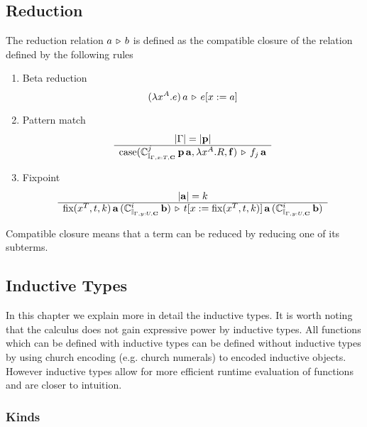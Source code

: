 \subsection{Reduction}
\label{sec:reduction}

\begin{definition}
  The reduction relation $a \,\triangleright\, b$ is defined as the compatible closure of
  the relation defined by the following rules
  \begin{enumerate}

  \item Beta reduction
    $$
    (\lambda x^A.e)\,a \,\triangleright\, e[x:=a]
    $$

  \item Pattern match
    $$
    \begin{array}{c} |\Gamma| = |\mathbf{p}| \\ \hline 
      \text{case}(
      \mathbb{C}^j_{\mathbb{I}_{\Gamma,x:T,\mathbf{C}}}\,\mathbf{p}\,\mathbf{a},
      \lambda x^A.R,
      \mathbf{f})
      \,\triangleright\, f_j \, \mathbf{a}
    \end{array}
    $$

  \item Fixpoint
    $$
    \begin{array}{c} |\mathbf{a}| = k \\ \hline 
      \text{fix}(x^T, t, k) \,
      \mathbf{a} \,
      (\mathbb{C}^i_{\mathbb{I}_{\Gamma,y:U,\mathbf{C}}} \, \mathbf{b})
      \,\triangleright\,
      t[x := \text{fix}(x^T, t, k)] \,
      \mathbf{a} \,
      (\mathbb{C}^i_{\mathbb{I}_{\Gamma,y:U,\mathbf{C}}} \, \mathbf{b})
    \end{array}
    $$
  \end{enumerate}
  Compatible closure means that a term can be reduced by reducing one of its
  subterms.
\end{definition}





\subsection{Inductive Types}
\label{sec:inductive-types}


In this chapter we explain more in detail the inductive types. It is worth
noting that the calculus does not gain expressive power by inductive
types. All functions which can be defined with inductive types can be defined
without inductive types by using church encoding (e.g. church numerals) to
encoded inductive objects. However inductive types allow for more efficient
runtime evaluation of functions and are closer to intuition.


\subsubsection{Kinds}

